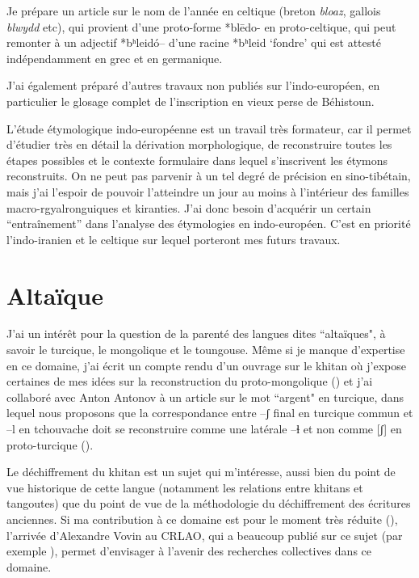 \documentclass[oldfontcommands,oneside,a4paper,11pt]{memoir}
\begin{document}
Je prépare un article sur le nom de l'année en celtique (breton \textit{bloaz}, gallois \textit{blwydd} etc), qui provient d'une proto-forme *blēdo- en proto-celtique, qui peut remonter à un adjectif *bʰleidó-- d'une racine *bʰleid  `fondre' qui est attesté indépendamment en grec et en germanique.

J'ai également préparé d'autres travaux non publiés sur l'indo-européen, en particulier le glosage complet de l'inscription en vieux perse de Béhistoun.

L'étude étymologique indo-européenne est un travail très formateur, car il permet d'étudier très en détail la dérivation morphologique, de reconstruire toutes les étapes possibles et le contexte formulaire dans lequel s'inscrivent les étymons reconstruits. On ne peut pas parvenir à un tel degré de précision en sino-tibétain, mais j'ai l'espoir de pouvoir l'atteindre un jour  au moins à l'intérieur des familles macro-rgyalronguiques et kiranties. J'ai donc besoin d'acquérir un certain ``entraînement'' dans l'analyse des étymologies en indo-européen. C'est en priorité l'indo-iranien et le celtique sur lequel porteront mes futurs travaux. 

\section{Altaïque}

J'ai un intérêt pour la question de la parenté des langues dites ``altaïques", à savoir le turcique, le mongolique et le toungouse. Même si je manque d'expertise en ce domaine, j'ai écrit un compte rendu d'un ouvrage sur le khitan où j'expose certaines de mes idées sur la reconstruction du proto-mongolique (\citealt{jacques10kitan}) et j'ai collaboré avec Anton Antonov à un article sur le mot ``argent" en turcique, dans lequel nous proposons que la correspondance entre --ʃ final en turcique commun et --l  en tchouvache doit se reconstruire comme une latérale --ɬ et non comme [ʃ] en proto-turcique (\citealt{antonov12kumush}).

Le déchiffrement du khitan est un sujet qui m'intéresse, aussi bien du point de vue historique de cette langue (notamment les relations entre khitans et tangoutes) que du point de vue de la méthodologie du déchiffrement des écritures anciennes. Si ma contribution à ce domaine est pour le moment très réduite  (\citealt{jacques10kitan}), l'arrivée d'Alexandre Vovin au CRLAO, qui a beaucoup publié sur ce sujet (par exemple \citealt{vovin11langjun}), permet d'envisager à l'avenir des recherches collectives dans ce domaine.
\end{document}

